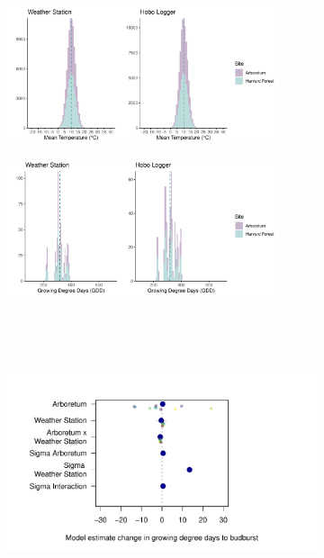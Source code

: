 \documentclass{article}\usepackage[]{graphicx}\usepackage[]{color}
\begin{document}
\begin{figure}
  \begin{subfigure}{.5\linewidth}
    \caption{}
    \centering
    \includegraphics[height=4cm, width=8cm]{..//analyses/figures/clim_methods_noisyws.pdf}
    \label{fig:muplotnoisyws}
  \end{subfigure}%
    \begin{subfigure}{.5\linewidth}
      \caption{}
      \centering
      \includegraphics[height=4cm, width=8cm]{..//analyses/figures/gdd_methods_noisyws.pdf}
    \label{fig:climnoisyws}
  \end{subfigure}\\[1ex]
  \begin{subfigure}{\linewidth}
	    \caption{}
      \centering
      \includegraphics[height=7cm, width=11cm]{..//analyses/figures/muplot_noisyws.pdf}
      \label{fig:gddnoisyws}
  \end{subfigure}

\end{figure}
\end{document}
